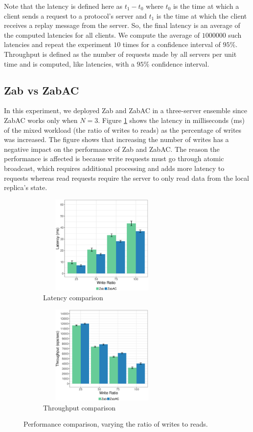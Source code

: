 \documentclass[a4paper,UKenglish]{oasics-v2016}
\begin{document}
Note that the latency is defined here as $t_{1}-t_{0}$ where $t_{0}$ is the time at which a client sends a request to a protocol's server and $t_{1}$ is the time at which the client receives a replay message from the server. So, the final latency is an average of the computed latencies for all clients. We compute the average of $1000000$ such latencies and repeat  the experiment $10$ times for a confidence interval of $95\%$. Throughput is defined as the number of requests made by all servers  per unit time and is computed, like latencies, with a $95\%$ confidence interval. 


\subsection{Zab vs ZabAC}

In this experiment, we deployed Zab and ZabAC in a three-server ensemble since ZabAC works only when $N=3$. Figure \ref{LatencyAC3} shows the latency in milliseconds (ms) of the mixed workload (the ratio of writes to reads) as the percentage of writes was increased. The figure shows that increasing the number of writes has a negative impact on the performance of Zab and ZabAC. The reason the performance is affected is because write requests must go through atomic broadcast, which requires additional processing and adds more latency to requests whereas read requests require the server to only read data from the local replica's state.

 \begin{figure}
	\begin{subfigure}{.5\linewidth}
		\includegraphics[width=180pt,height=140pt, scale=0.39]{figuress/LN3_AC.eps}
		\caption{Latency comparison}
		\label{LatencyAC3}
	\end{subfigure}		
	\begin{subfigure}{.5\linewidth}
		\includegraphics[width=180pt,height=140pt, scale=0.39]{figuress/TN3_AC.eps}
		\caption{Throughput comparison}
		\label{ThroughpuAC3}
	\end{subfigure}		
\caption{Performance comparison, varying the ratio of writes to reads.}
	\label{latency comparison}
\end{figure}
\end{document}
